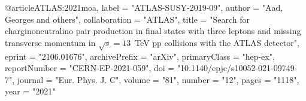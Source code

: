 @article{ATLAS:2021moa,
    label = "ATLAS-SUSY-2019-09",
    author = "Aad, Georges and others",
    collaboration = "ATLAS",
    title = "{Search for chargino\textendash{}neutralino pair production in final states with three leptons and missing transverse momentum in $\sqrt{s} = 13$~TeV pp collisions with the ATLAS detector}",
    eprint = "2106.01676",
    archivePrefix = "arXiv",
    primaryClass = "hep-ex",
    reportNumber = "CERN-EP-2021-059",
    doi = "10.1140/epjc/s10052-021-09749-7",
    journal = "Eur. Phys. J. C",
    volume = "81",
    number = "12",
    pages = "1118",
    year = "2021"
}

